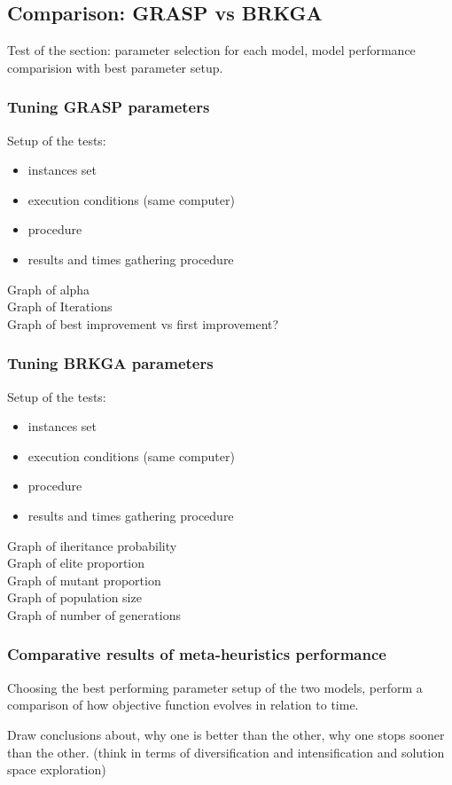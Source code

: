 \subsection{Comparison: GRASP vs BRKGA}

Test of the section: parameter selection for each model, model performance comparision with best parameter setup.


\subsubsection{Tuning GRASP parameters}


Setup of the tests:\\
\begin{itemize}
	\item instances set
	\item execution conditions (same computer)
	\item procedure
	\item results and times gathering procedure
\end{itemize}


Graph of alpha\\
Graph of Iterations\\
Graph of best improvement vs first improvement?\\

\subsubsection{Tuning BRKGA parameters}


Setup of the tests:\\
\begin{itemize}
	\item instances set
	\item execution conditions (same computer)
	\item procedure
	\item results and times gathering procedure
\end{itemize}


Graph of iheritance probability\\
Graph of elite proportion\\
Graph of mutant proportion\\
Graph of population size\\
Graph of number of generations\\

\subsubsection{Comparative results of meta-heuristics performance}

Choosing the best performing parameter setup of the two models, perform a comparison of how objective function evolves in relation to time.

Draw conclusions about, why one is better than the other, why one stops sooner than the other. (think in terms of diversification and intensification and solution space exploration)\\

\pagebreak